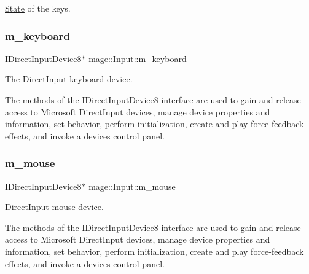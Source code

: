 \hyperlink{classmage_1_1_state}{State} of the keys. \hypertarget{classmage_1_1_input_a18ffc2becd62b77e9c4830e92cdf9999}{}\label{classmage_1_1_input_a18ffc2becd62b77e9c4830e92cdf9999} 
\subsubsection{\texorpdfstring{m\+\_\+keyboard}{m\_keyboard}}
{\footnotesize\ttfamily I\+Direct\+Input\+Device8$\ast$ mage\+::\+Input\+::m\+\_\+keyboard\hspace{0.3cm}{\ttfamily [protected]}}

The Direct\+Input keyboard device.

The methods of the I\+Direct\+Input\+Device8 interface are used to gain and release access to Microsoft Direct\+Input devices, manage device properties and information, set behavior, perform initialization, create and play force-\/feedback effects, and invoke a device\textquotesingle{}s control panel. \hypertarget{classmage_1_1_input_ab62252cea073f7f0fae71ad4cb76a288}{}\label{classmage_1_1_input_ab62252cea073f7f0fae71ad4cb76a288} 
\subsubsection{\texorpdfstring{m\+\_\+mouse}{m\_mouse}}
{\footnotesize\ttfamily I\+Direct\+Input\+Device8$\ast$ mage\+::\+Input\+::m\+\_\+mouse\hspace{0.3cm}{\ttfamily [protected]}}

Direct\+Input mouse device.

The methods of the I\+Direct\+Input\+Device8 interface are used to gain and release access to Microsoft Direct\+Input devices, manage device properties and information, set behavior, perform initialization, create and play force-\/feedback effects, and invoke a device\textquotesingle{}s control panel. \hypertarget{classmage_1_1_input_accf558cd7da26ec27b24fde21627a07e}{}\label{classmage_1_1_input_accf558cd7da26ec27b24fde21627a07e} 
